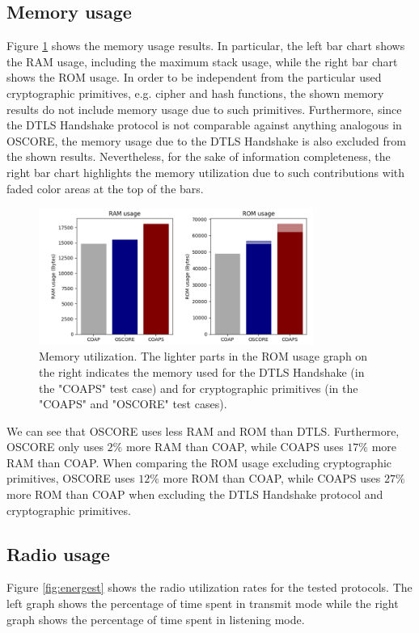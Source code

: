{\subsection{Memory usage}
Figure \ref{fig:memory} shows the memory usage results. In particular, the left bar chart shows the RAM usage, including the maximum stack usage, while the right bar chart shows the ROM usage. In order to be independent from the particular used cryptographic primitives, e.g. cipher and hash functions, the shown memory results do not include memory usage due to such primitives. Furthermore, since the DTLS Handshake protocol is not comparable against anything analogous in OSCORE, the memory usage due to the DTLS Handshake is also excluded from the shown results. Nevertheless, for the sake of information completeness, the right bar chart highlights the memory utilization due to such contributions with faded color areas at the top of the bars.

\begin{figure}[h]
\centering
\includegraphics[width=0.8\textwidth]{papers/oscore/images/memory.png}
\caption[Memory utilization]{Memory utilization. The lighter parts in the ROM usage graph on the right indicates the memory used for the DTLS Handshake (in the "COAPS" test case) and for cryptographic primitives (in the "COAPS" and "OSCORE" test cases).}
\label{fig:memory}
\end{figure}

We can see that OSCORE uses less RAM and ROM than DTLS. Furthermore, OSCORE only uses $2\%$ more RAM than COAP, while COAPS uses $17\%$ more RAM than COAP. When comparing the ROM usage excluding cryptographic primitives, OSCORE uses $12\%$ more ROM than COAP, while COAPS uses $27\%$ more ROM than COAP when excluding the DTLS Handshake protocol and cryptographic primitives.

\subsection{Radio usage}
Figure \ref{fig:energest} shows the radio utilization rates for the tested protocols. The left graph shows the percentage of time spent in transmit mode while the right graph shows the percentage of time spent in listening mode. 

}
